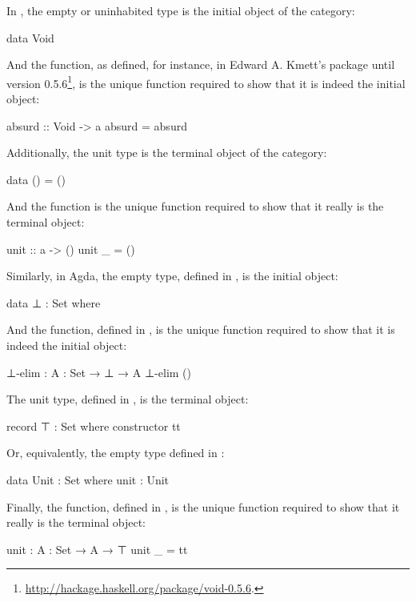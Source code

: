 \begin{example}
  \label{ex:initial-terminal-objects-haskell}

  In \hask, the empty or uninhabited type is the initial object of the
  category:
  \begin{codehaskell}
data Void
  \end{codehaskell}
  And the  function, as defined, for instance, in
  Edward A. Kmett's  package until version
  0.5.6\footnote{\url{http://hackage.haskell.org/package/void-0.5.6}.},
  is the unique function required to show that it is indeed the
  initial object:
  \begin{codehaskell}
absurd :: Void -> a
absurd = absurd
  \end{codehaskell}
  Additionally, the unit type is the terminal object of the category:
  \begin{codehaskell}
data () = ()
  \end{codehaskell}
  And the  function is the unique function required
  to show that it really is the terminal object:
  \begin{codehaskell}
unit :: a -> ()
unit _ = ()
  \end{codehaskell}

\end{example}

\begin{example}
  \label{ex:initial-terminal-objects-agda}

  Similarly, in Agda, the empty type, defined in ,
  is the initial object:
  \begin{codeagda}
data ⊥ : Set where
  \end{codeagda}
  And the  function, defined in
  , is the unique function required to show
  that it is indeed the initial object:
  \begin{codeagda}
⊥-elim : {A : Set} → ⊥ → A
⊥-elim ()
  \end{codeagda}
  The unit type, defined in , is the terminal
  object:
  \begin{codeagda}
record ⊤ : Set where
  constructor tt
  \end{codeagda}
  Or, equivalently, the empty type defined in :
  \begin{codeagda}
data Unit : Set where
  unit : Unit
  \end{codeagda}
  Finally, the  function, defined in
  , is the unique function required to show
  that it really is the terminal object:
  \begin{codeagda}
unit : {A : Set} → A → ⊤
unit _ = tt
  \end{codeagda}

\end{example}

